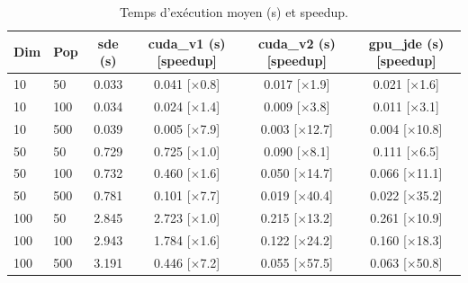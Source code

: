 \begin{table}[t]
\centering
\caption{Temps d'exécution moyen (s) et speedup.}
\label{tab:time}
\scriptsize
\begin{tabular}{llcccc}
\toprule
Dim & Pop & sde (s) & cuda\_v1 (s) [speedup] & cuda\_v2 (s) [speedup] & gpu\_jde (s) [speedup] \\
\midrule
10 & 50 & 0.033 & 0.041 [$\times$0.8] & 0.017 [$\times$1.9] & 0.021 [$\times$1.6] \\
10 & 100 & 0.034 & 0.024 [$\times$1.4] & 0.009 [$\times$3.8] & 0.011 [$\times$3.1] \\
10 & 500 & 0.039 & 0.005 [$\times$7.9] & 0.003 [$\times$12.7] & 0.004 [$\times$10.8] \\
50 & 50 & 0.729 & 0.725 [$\times$1.0] & 0.090 [$\times$8.1] & 0.111 [$\times$6.5] \\
50 & 100 & 0.732 & 0.460 [$\times$1.6] & 0.050 [$\times$14.7] & 0.066 [$\times$11.1] \\
50 & 500 & 0.781 & 0.101 [$\times$7.7] & 0.019 [$\times$40.4] & 0.022 [$\times$35.2] \\
100 & 50 & 2.845 & 2.723 [$\times$1.0] & 0.215 [$\times$13.2] & 0.261 [$\times$10.9] \\
100 & 100 & 2.943 & 1.784 [$\times$1.6] & 0.122 [$\times$24.2] & 0.160 [$\times$18.3] \\
100 & 500 & 3.191 & 0.446 [$\times$7.2] & 0.055 [$\times$57.5] & 0.063 [$\times$50.8] \\
\bottomrule
\end{tabular}
\end{table}
